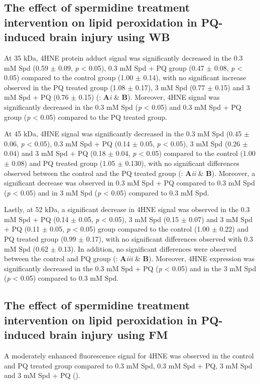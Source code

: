 \subsection{The effect of spermidine treatment intervention on lipid peroxidation in PQ-induced brain injury using WB}
At 35 kDa, 4HNE protein adduct signal was significantly decreased in the 0.3 mM Spd (0.59 $\pm$ 0.09, \textit{p} < 0.05), 0.3 mM Spd + PQ group (0.47 $\pm$ 0.08, \textit{p} < 0.05) compared to the control group (1.00 $\pm$ 0.14), with no significant increase observed in the PQ treated group (1.08 $\pm$ 0.17), 3 mM Spd (0.77 $\pm$ 0.15) and 3 mM Spd + PQ (0.76 $\pm$ 0.15) (: \textbf{A}\textit{i} \& \textbf{B}). Moreover, 4HNE signal was significantly decreased in the 0.3 mM Spd (\textit{p} < 0.05) and 0.3 mM Spd + PQ group (\textit{p} < 0.05) compared to the PQ treated group. 

At 45 kDa, 4HNE signal was significantly decreased in the 0.3 mM Spd (0.45 $\pm$ 0.06, \textit{p} < 0.05), 0.3 mM Spd + PQ (0.14 $\pm$ 0.05, \textit{p} < 0.05), 3 mM Spd (0.26 $\pm$ 0.04) and 3 mM Spd + PQ (0.18 $\pm$ 0.04, \textit{p} < 0.05) compared to the control (1.00 $\pm$ 0.08) and PQ treated group (1.05 $\pm$ 0.130), with no significant differences observed between the control and the PQ treated group (: \textbf{A}\textit{ii} \& \textbf{B}). Moreover, a significant decrease was observed in 0.3 mM Spd + PQ compared to 0.3 mM Spd (\textit{p} < 0.05) and in 3 mM Spd (\textit{p} < 0.05) compared to 0.3 mM Spd.

Lastly, at 52 kDa, a significant decrease in 4HNE signal was observed in the 0.3 mM Spd + PQ (0.14 $\pm$ 0.05, \textit{p} < 0.05), 3 mM Spd (0.15 $\pm$ 0.07) and 3 mM Spd + PQ (0.11 $\pm$ 0.05, \textit{p} < 0.05) group compared to the control (1.00 $\pm$ 0.22) and PQ treated group (0.99 $\pm$ 0.17), with no significant differences observed with 0.3 mM Spd (0.62 $\pm$ 0.13). In addition, no significant differences were observed between the control and PQ group (: \textbf{A}\textit{iii} \& \textbf{B}). Moreover, 4HNE expression was significantly decreased in the 0.3 mM Spd + PQ (\textit{p} < 0.05) and in the 3 mM Spd (\textit{p} < 0.05) compared to 0.3 mM Spd.

\subsection{The effect of spermidine treatment intervention on lipid peroxidation in PQ-induced brain injury using FM}
A moderately enhanced fluorescence signal for 4HNE was observed in the control and PQ treated group compared to 0.3 mM Spd, 0.3 mM Spd + PQ, 3 mM Spd and 3 mM Spd + PQ ().

